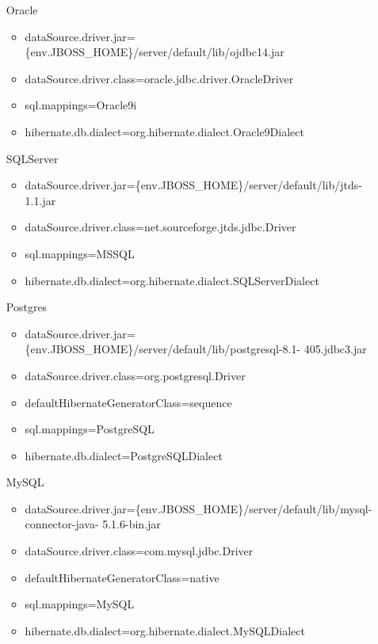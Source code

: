 \begin{itemize}
\item [Oracle] \hfill
\begin{itemize}
\item
dataSource.driver.jar=\textdollar{}\{env.JBOSS\_HOME\}/server/default/lib/ojdbc14.jar
\item dataSource.driver.class=oracle.jdbc.driver.OracleDriver
\item sql.mappings=Oracle9i
\item hibernate.db.dialect=org.hibernate.dialect.Oracle9Dialect
\end{itemize}
\item [SQLServer] \hfill
\begin{itemize}
\item
dataSource.driver.jar=\textdollar{}\{env.JBOSS\_HOME\}/server/default/lib/jtds-1.1.jar
\item dataSource.driver.class=net.sourceforge.jtds.jdbc.Driver
\item sql.mappings=MSSQL
\item hibernate.db.dialect=org.hibernate.dialect.SQLServerDialect
\end{itemize} 
\item [Postgres] \hfill
\begin{itemize}
\item
dataSource.driver.jar=\textdollar{}\{env.JBOSS\_HOME\}/server/default/lib/postgresql-8.1-
405.jdbc3.jar
\item dataSource.driver.class=org.postgresql.Driver
\item defaultHibernateGeneratorClass=sequence
\item sql.mappings=PostgreSQL
\item hibernate.db.dialect=PostgreSQLDialect
\end{itemize}
\item [MySQL] \hfill
\begin{itemize}
\item
dataSource.driver.jar=\textdollar{}\{env.JBOSS\_HOME\}/server/default/lib/mysql-connector-java-
5.1.6-bin.jar
\item dataSource.driver.class=com.mysql.jdbc.Driver
\item defaultHibernateGeneratorClass=native
\item sql.mappings=MySQL
\item hibernate.db.dialect=org.hibernate.dialect.MySQLDialect
\end{itemize}
\end{itemize}

